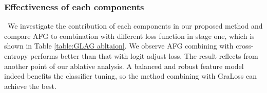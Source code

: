 \documentclass[runningheads]{llncs}
\begin{document}
\setlength{\tabcolsep}{4pt}
\begin{table}
\begin{center}
\caption{Ablation study on CIFAR100-LT for different decoupled methods. In stage one, we use different loss function to train the feature model. In stage two, we use different decoupled methods to train the classifier. }
\label{table:GraLoss&decouple}
\end{center}
\end{table}
\setlength{\tabcolsep}{1.4pt}



\vspace{-10mm}
\subsubsection{Effectiveness of each components} \ We investigate the contribution of each components in our proposed method and compare AFG to combination with different loss function in stage one, which is shown in Table \ref{table:GLAG abltaion}. We observe AFG combining with cross-entropy performs better than that with logit adjust loss. The result reflects from another point of our ablative analysis. A balanced and robust feature model indeed benefits the classifier tuning, so the method combining with GraLoss can achieve the best.
\end{document}
